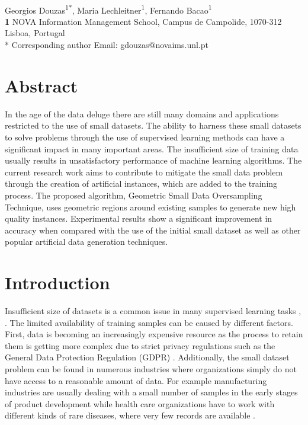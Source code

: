 \documentclass[10pt,letterpaper]{article}
\begin{document}
\vspace*{0.2in}
\begin{flushleft}
{\Large
\textbf{} %
}
\textbf{}
\newline
\\
Georgios Douzas\textsuperscript{1*},
Maria Lechleitner\textsuperscript{1},
Fernando Bacao\textsuperscript{1}
\\
\bigskip
\textbf{1} NOVA Information Management School, Campus de Campolide, 1070-312 Lisboa, Portugal
\\
\bigskip
* Corresponding author
\newline
Email: gdouzas@novaims.unl.pt
\end{flushleft}

\section*{Abstract}
In the age of the data deluge there are still many domains and applications restricted to the use of small datasets. The ability to harness these small datasets to solve problems through the use of supervised learning methods can have a significant impact in many important areas. The insufficient size of training data usually results in unsatisfactory performance of machine learning algorithms. The current research work aims to contribute to mitigate the small data problem through the creation of artificial instances, which are added to the training process. The proposed algorithm, Geometric Small Data Oversampling Technique, uses geometric regions around existing samples to generate new high quality instances. Experimental results show a significant improvement in accuracy when compared with the use of the initial small dataset as well as other popular artificial data generation techniques.

\linenumbers

\section{Introduction}

Insufficient size of datasets is a common issue in many supervised learning tasks \cite{Niyogi.1998}, \cite{AbdulLateh.2017}. The limited availability of training samples can be caused by different factors. First, data is becoming an increasingly expensive resource \cite{Li.2007} as the process to retain them is getting more complex due to strict privacy regulations such as the General Data Protection Regulation (GDPR) \cite{EuropeanCommission.2019}. Additionally, the small dataset problem can be found in numerous industries where organizations simply do not have access to a reasonable amount of data. For example manufacturing industries are usually dealing with a small number of samples in the early stages of product development while health care organizations have to work with different kinds of rare diseases, where very few records are available \cite{AbdulLateh.2017}.
\end{document}
